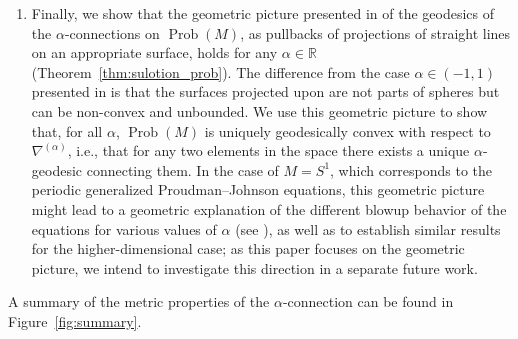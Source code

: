 \documentclass[11pt,reqno]{amsart}
\theoremstyle{definition}
\newcommand{\R}{\mathbb R}
\newcommand{\Prob}{\operatorname{Prob}(M)}
\begin{document}
\begin{enumerate}
    For finite-dimensional parametric statistical models, we show in Proposition~\ref{prop:exponential} that a similar phenomenon holds for two-dimensional exponential families; it would be interesting to know whether this result holds in any dimension. We also show that other statistical models can present a different behavior, namely we %
    give an  example of a statistical model such that all $\alpha$-connections are metric (Example~\ref{ex:finite-dim}).
\item 
    Finally, we show that the geometric picture presented in \cite{bauer2024p} of the geodesics of the $\alpha$-connections  on $\Prob$, as pullbacks of projections of straight lines on an appropriate surface, holds for any $\alpha\in \R$ (Theorem~\ref{thm:sulotion_prob}).
    The difference from the case $\alpha\in (-1,1)$ presented in \cite{bauer2024p} is that the surfaces projected upon are not parts of spheres but can be non-convex and unbounded. 
    We use this geometric picture to show that, for all $\alpha$, $\Prob$ is uniquely geodesically convex with respect to $\nabla^{(\alpha)}$, i.e., that for any two elements in the space there exists a unique $\alpha$-geodesic connecting them.
    In the case of $M=S^1$, which corresponds to the periodic generalized Proudman--Johnson equations, this geometric picture might lead to a geometric explanation of the different blowup behavior of the equations for various values of $\alpha$ (see \cite{sarria2013blow,kogelbauer2020global}), as well as to establish similar results for the higher-dimensional case; as this paper focuses on the geometric picture, we intend to investigate this direction in a separate future work.
\end{enumerate}
A summary of the   metric properties of the $\alpha$-connection can be found in Figure~\ref{fig:summary}.
\end{document}

